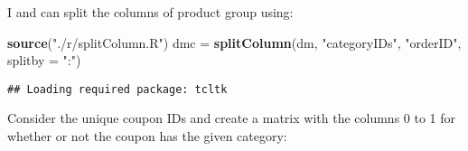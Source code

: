 \documentclass[10pt]{report}
\newenvironment{Shaded}{}{}
\newcommand{\KeywordTok}[1]{\textcolor[rgb]{0.00,0.44,0.13}{\textbf{{#1}}}}
\newcommand{\DataTypeTok}[1]{\textcolor[rgb]{0.56,0.13,0.00}{{#1}}}
\newcommand{\DecValTok}[1]{\textcolor[rgb]{0.25,0.63,0.44}{{#1}}}
\newcommand{\StringTok}[1]{\textcolor[rgb]{0.25,0.44,0.63}{{#1}}}
\newcommand{\CommentTok}[1]{\textcolor[rgb]{0.38,0.63,0.69}{\textit{{#1}}}}
\newcommand{\NormalTok}[1]{{#1}}
\begin{document}
I and can split the columns of product group using:

\begin{Shaded}
\begin{Highlighting}[]
\KeywordTok{source}\NormalTok{(}\StringTok{"./r/splitColumn.R"}\NormalTok{)}
\NormalTok{dmc =}\StringTok{ }\KeywordTok{splitColumn}\NormalTok{(dm, }\StringTok{"categoryIDs"}\NormalTok{, }\StringTok{"orderID"}\NormalTok{, }\DataTypeTok{splitby =} \StringTok{":"}\NormalTok{)}
\end{Highlighting}
\end{Shaded}

\begin{verbatim}
## Loading required package: tcltk
\end{verbatim}

\begin{Shaded}
\end{Shaded}

Consider the unique coupon IDs and create a matrix with the columns 0 to
1 for whether or not the coupon has the given category:
\end{document}
